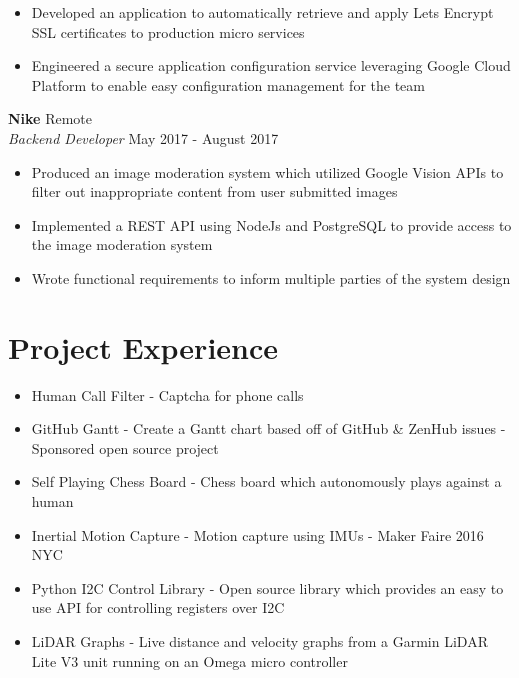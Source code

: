 \documentclass[10pt]{article}
\begin{document}
\begin{flushleft}
\begin{itemize}
		\item Developed an application to automatically retrieve and apply Lets Encrypt SSL certificates to production 
			micro services

		\item Engineered a secure application configuration service leveraging Google Cloud Platform to enable easy 
		      configuration management for the team
	\end{itemize}

	\vspace{0.5em}
	\textbf{Nike} \hfill Remote \\
	\textit{Backend Developer} \hfill May 2017 - August 2017 \\
	\begin{itemize}
		\item Produced an image moderation system which utilized Google Vision APIs to filter out inappropriate content 
		    from user submitted images

		\item Implemented a REST API using NodeJs and PostgreSQL to provide access to the image moderation system

		\item Wrote functional requirements to inform multiple parties of the system design
	\end{itemize}

\section{Project Experience}
	\begin{itemize}
		\item Human Call Filter - Captcha for phone calls

		\item GitHub Gantt - Create a Gantt chart based off of GitHub \& ZenHub issues - Sponsored open source project

		\item Self Playing Chess Board - Chess board which autonomously plays against a human

		\item Inertial Motion Capture - Motion capture using IMUs - Maker Faire 2016 NYC

		\item Python I2C Control Library - Open source library which provides an easy to use API for controlling 
			registers over I2C

		\item LiDAR Graphs - Live distance and velocity graphs from a Garmin LiDAR Lite V3 unit running on an 
			Omega micro controller


\end{itemize}
\end{flushleft}
\end{document}
